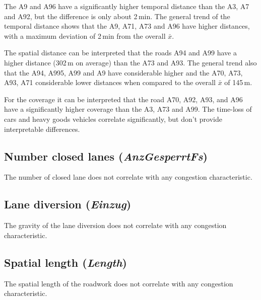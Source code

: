 The A9 and A96 have a significantly higher temporal distance than the A3, A7 and A92, but the difference is only about 2\,min. The general trend of the temporal distance shows that the A9, A71, A73 and A96 have higher distances, with a maximum deviation of 2\,min from the overall $\bar{x}$.

The spatial distance can be interpreted that the roads A94 and A99 have a higher distance (302\,m on average) than the A73 and A93. The general trend also that the A94, A995, A99 and A9 have considerable higher and the A70, A73, A93, A71 considerable lower distances when compared to the overall $\bar{x}$ of 145\,m.

For the coverage it can be interpreted that the road A70, A92, A93, and A96 have a significantly higher coverage than the A3, A73 and A99. The time-loss of cars and heavy goods vehicles correlate significantly, but don't provide interpretable differences.

\subsection{Number closed lanes (\textit{AnzGesperrtFs})}
The number of closed lane does not correlate with any congestion characteristic.

\subsection{Lane diversion (\textit{Einzug})}
The gravity of the lane diversion does not correlate with any congestion characteristic.

\subsection{Spatial length (\textit{Length})}
The spatial length of the roadwork does not correlate with any congestion characteristic. 

